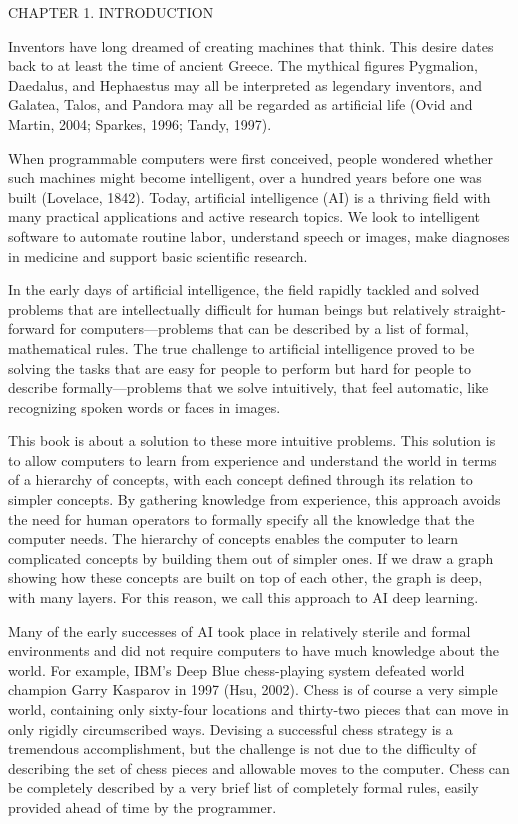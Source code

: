 \documentclass[11pt]{article}
\begin{document}
CHAPTER 1. INTRODUCTION

Inventors have long dreamed of creating machines that think.
This desire dates back to at least the time of ancient Greece.
The mythical figures Pygmalion, Daedalus, and Hephaestus may all be interpreted as legendary inventors, and Galatea, Talos, and Pandora may all be regarded as artificial life (Ovid and Martin, 2004; Sparkes, 1996; Tandy, 1997).

When programmable computers were first conceived, people wondered whether such machines might become intelligent, over a hundred years before one was built (Lovelace, 1842).
Today, artiﬁcial intelligence (AI) is a thriving ﬁeld with many practical applications and active research topics.
We look to intelligent software to automate routine labor, understand speech or images, make diagnoses in medicine and support basic scientific research.

In the early days of artificial intelligence, the field rapidly tackled and solved problems that are intellectually diﬃcult for human beings but relatively straight-forward for computers—problems that can be described by a list of formal, mathematical rules.
The true challenge to artificial intelligence proved to be solving the tasks that are easy for people to perform but hard for people to describe formally—problems that we solve intuitively, that feel automatic, like recognizing spoken words or faces in images.

This book is about a solution to these more intuitive problems.
This solution is to allow computers to learn from experience and understand the world in terms of a hierarchy of concepts, with each concept defined through its relation to simpler concepts.
By gathering knowledge from experience, this approach avoids the need for human operators to formally specify all the knowledge that the computer needs.
The hierarchy of concepts enables the computer to learn complicated concepts by building them out of simpler ones.
If we draw a graph showing how these concepts are built on top of each other, the graph is deep, with many layers.
For this reason, we call this approach to AI deep learning.

Many of the early successes of AI took place in relatively sterile and formal environments and did not require computers to have much knowledge about the world.
For example, IBM’s Deep Blue chess-playing system defeated world champion Garry Kasparov in 1997 (Hsu, 2002).
Chess is of course a very simple world, containing only sixty-four locations and thirty-two pieces that can move in only rigidly circumscribed ways.
Devising a successful chess strategy is a tremendous accomplishment, but the challenge is not due to the diﬃculty of describing the set of chess pieces and allowable moves to the computer.
Chess can be completely described by a very brief list of completely formal rules, easily provided ahead of time by the programmer.
\end{document}
